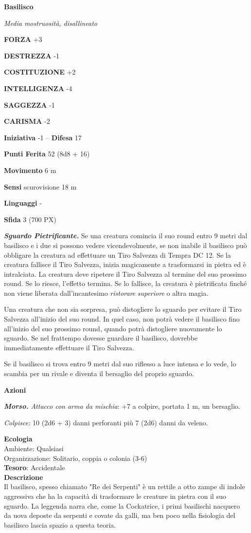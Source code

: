 \begin{multicols}{2}
	\medskip{}\textbf{Basilisco}

	\textit{Media mostruosità, disallineato}

	\textbf{FORZA} +3

	\textbf{DESTREZZA} -1

	\textbf{COSTITUZIONE} +2

	\textbf{INTELLIGENZA} -4

	\textbf{SAGGEZZA} -1

	\textbf{CARISMA} -2

	\textbf{Iniziativa} -1 -- \textbf{Difesa} 17

	\textbf{Punti Ferita} 52 (8d8 + 16)

	\textbf{Movimento} 6 m

	\textbf{Sensi} scurovisione 18 m

	\textbf{Linguaggi} -

	\textbf{Sfida} 3 (700 PX)

	\textit{\textbf{Sguardo Pietrificante.}} Se una creatura comincia il suo round entro 9 metri dal basilisco e i due si possono vedere vicendevolmente, se non inabile il basilisco può obbligare la creatura ad effettuare un Tiro Salvezza di Tempra DC 12. Se la creatura fallisce il Tiro Salvezza, inizia magicamente a trasformarsi in pietra ed è intralciata. La creatura deve ripetere il Tiro Salvezza al termine del suo prossimo round. Se lo riesce, l'effetto termina. Se lo fallisce, la creatura è pietrificata finché non viene liberata dall'incantesimo \textit{ristorare} \textit{superiore} o altra magia.

	Una creatura che non sia sorpresa, può distogliere lo sguardo per evitare il Tiro Salvezza all'inizio del suo round. In quel caso, non potrà vedere il basilisco fino all'inizio del suo prossimo round, quando potrà distogliere nuovamente lo sguardo. Se nel frattempo dovesse guardare il basilisco, dovrebbe immediatamente effettuare il Tiro Salvezza.

	Se il basilisco si trova entro 9 metri dal suo riflesso a luce intensa e lo vede, lo scambia per un rivale e diventa il bersaglio del proprio sguardo.

	\textbf{Azioni}

	\textit{\textbf{Morso.} Attacco con arma da mischia}: +7 a colpire, portata 1 m, un bersaglio.

	\textit{Colpisce:} 10 (2d6 + 3) danni perforanti più 7 (2d6) danni da veleno.

	\textbf{Ecologia}\\
	Ambiente: Qualsiasi\\
	Organizzazione: Solitario, coppia o colonia (3-6)\\
	\textbf{Tesoro}: Accidentale\\
	\textbf{Descrizione}\\
	Il basilisco, spesso chiamato "Re dei Serpenti" è un rettile a otto zampe di indole aggressiva che ha la capacità di trasformare le creature in pietra con il suo sguardo. La leggenda narra che, come la Cockatrice, i primi basilischi nacquero da uova deposte da serpenti e covate da galli, ma ben poco nella fisiologia del basilisco lascia spazio a questa teoria.


\end{multicols}
